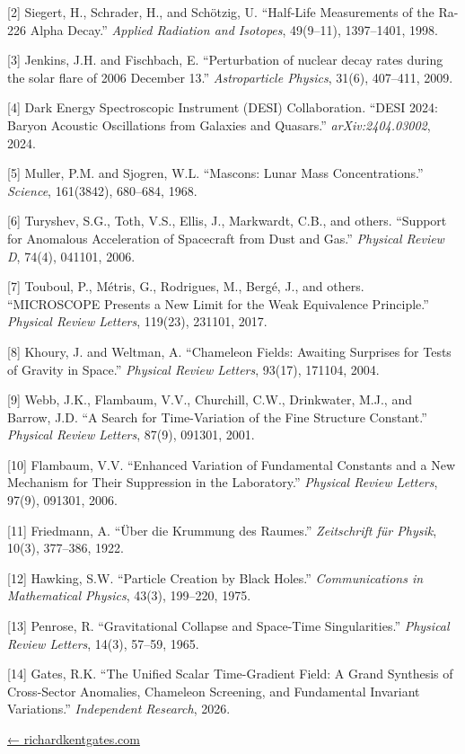 \documentclass[
  10pt,
]{article}
\begin{document}
{[}2{]} Siegert, H., Schrader, H., and Schötzig, U. ``Half-Life
Measurements of the Ra-226 Alpha Decay.'' \emph{Applied Radiation and
Isotopes}, 49(9--11), 1397--1401, 1998.

{[}3{]} Jenkins, J.H. and Fischbach, E. ``Perturbation of nuclear decay
rates during the solar flare of 2006 December 13.'' \emph{Astroparticle
Physics}, 31(6), 407--411, 2009.

{[}4{]} Dark Energy Spectroscopic Instrument (DESI) Collaboration.
``DESI 2024: Baryon Acoustic Oscillations from Galaxies and Quasars.''
\emph{arXiv:2404.03002}, 2024.

{[}5{]} Muller, P.M. and Sjogren, W.L. ``Mascons: Lunar Mass
Concentrations.'' \emph{Science}, 161(3842), 680--684, 1968.

{[}6{]} Turyshev, S.G., Toth, V.S., Ellis, J., Markwardt, C.B., and
others. ``Support for Anomalous Acceleration of Spacecraft from Dust and
Gas.'' \emph{Physical Review D}, 74(4), 041101, 2006.

{[}7{]} Touboul, P., Métris, G., Rodrigues, M., Bergé, J., and others.
``MICROSCOPE Presents a New Limit for the Weak Equivalence Principle.''
\emph{Physical Review Letters}, 119(23), 231101, 2017.

{[}8{]} Khoury, J. and Weltman, A. ``Chameleon Fields: Awaiting
Surprises for Tests of Gravity in Space.'' \emph{Physical Review
Letters}, 93(17), 171104, 2004.

{[}9{]} Webb, J.K., Flambaum, V.V., Churchill, C.W., Drinkwater, M.J.,
and Barrow, J.D. ``A Search for Time-Variation of the Fine Structure
Constant.'' \emph{Physical Review Letters}, 87(9), 091301, 2001.

{[}10{]} Flambaum, V.V. ``Enhanced Variation of Fundamental Constants
and a New Mechanism for Their Suppression in the Laboratory.''
\emph{Physical Review Letters}, 97(9), 091301, 2006.

{[}11{]} Friedmann, A. ``Über die Krummung des Raumes.''
\emph{Zeitschrift für Physik}, 10(3), 377--386, 1922.

{[}12{]} Hawking, S.W. ``Particle Creation by Black Holes.''
\emph{Communications in Mathematical Physics}, 43(3), 199--220, 1975.

{[}13{]} Penrose, R. ``Gravitational Collapse and Space-Time
Singularities.'' \emph{Physical Review Letters}, 14(3), 57--59, 1965.

{[}14{]} Gates, R.K. ``The Unified Scalar Time-Gradient Field: A Grand
Synthesis of Cross-Sector Anomalies, Chameleon Screening, and
Fundamental Invariant Variations.'' \emph{Independent Research}, 2026.

\href{https://richardkentgates.com/}{← richardkentgates.com}
\end{document}
